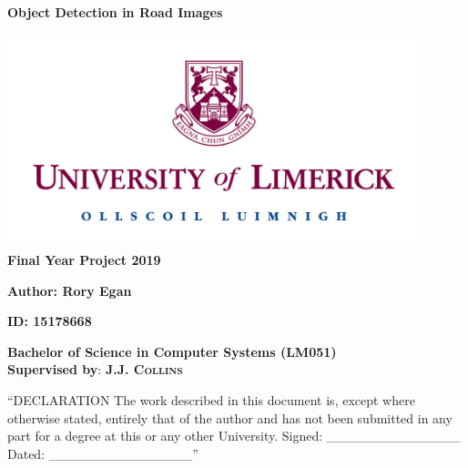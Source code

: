 \documentclass[12pt]{report}
\begin{document}
 \begin{titlepage}
   \begin{center}
        \vspace*{0.5cm}

        \begin{Huge}
        \textbf{Object Detection in Road Images}
        \end{Huge}
        
        \vspace{0.5cm}
        \includegraphics[width=12cm]{ul} \\
    	
    	\normalsize
        \vspace{1.5cm}
        \textbf{Final Year Project 2019} 
        
        \vspace{0.5cm}
        \textbf{Author: Rory Egan}
        
        \vspace{0.5cm}
        \textbf{ID: 15178668}
 
        \vfill
        \textbf{Bachelor of Science in Computer Systems (LM051)} \\
        \normalsize
        \vspace{0.5cm}
        \textbf{Supervised by}: \textsc{\textbf{J.J. Collins}}
 
  \end{center}
 \end{titlepage}
 
\clearpage
\begin{flushleft}
“DECLARATION
\linebreak
\linebreak
The work described in this document is, except where otherwise stated, entirely that of the author and has not been submitted in any part for a degree at this or any other University.
\linebreak
\linebreak
Signed: \_\_\_\_\_\_\_\_\_\_\_\_\_\_
\linebreak
Dated: \_\_\_\_\_\_\_\_\_\_\_\_\_\_\_”
\end{flushleft}
\end{document}
